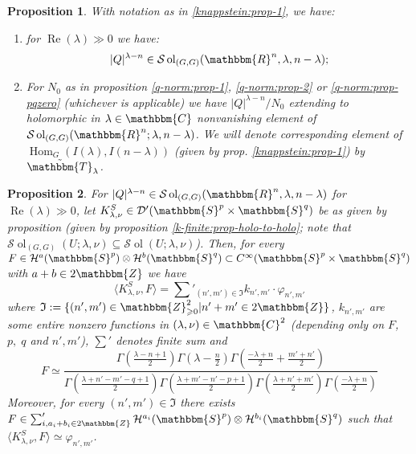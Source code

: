 \documentclass{article}
\newcommand{\assign}{:=}
\newcommand{\tmop}[1]{\ensuremath{\operatorname{#1}}}
\numberwithin{definition}{section}
\numberwithin{lemma}{section}
\newtheorem{proposition}{Proposition}
\numberwithin{proposition}{section}
{\theorembodyfont{\rmfamily}\newtheorem{remark}{Remark}
\numberwithin{remark}{section}
}
\begin{document}
\begin{proposition}
  \label{knappstein:prop-holo}With notation as in \ref{knappstein:prop-1}, we
  have:
  \begin{enumerate}
    \item for $\tmop{Re} ( \lambda) \gg 0$ we have:
    \[ | Q |^{\lambda - n} \in \mathcal{S} \tmop{ol}_{( G, G)} (
       \mathbbm{R}^n, \lambda, n - \lambda) ; \]
    \item For $N_0$ as in proposition \ref{q-norm:prop-1}, \ref{q-norm:prop-2}
    or \ref{q-norm:prop-pqzero} (whichever is applicable) we have $| Q
    |^{\lambda - n} / N_0$ extending to holomorphic in $\lambda \in
    \mathbbm{C}$ nonvanishing element of $\mathcal{S} \tmop{ol}_{( G, G)} (
    \mathbbm{R}^n ; \lambda, n - \lambda)$. We will denote corresponding
    element of $\tmop{Hom}_G ( I ( \lambda), I ( n - \lambda))$ (given by
    prop. \ref{knappstein:prop-1}) by $\tilde{\mathbbm{T}}_{\lambda}$.
  \end{enumerate}
\end{proposition}

\begin{proposition}
  \label{knappstein:prop-kfinite}For $| Q |^{\lambda - n} \in \mathcal{S}
  \tmop{ol}_{( G, G)} ( \mathbbm{R}^n, \lambda, n - \lambda)$ for $\tmop{Re} (
  \lambda) \gg 0$, let $K_{\lambda, \nu}^S \in \mathcal{D}' ( \mathbbm{S}^p
  \times \mathbbm{S}^q)$ be as given by proposition (given by proposition
  \ref{k-finite:prop-holo-to-holo}; note that $\mathcal{S} \tmop{ol}_{( G, G)}
  ( U ; \lambda, \nu) \subseteq \mathcal{S} \tmop{ol} ( U ; \lambda, \nu)$).
  Then, for every $F \in \mathcal{H}^a ( \mathbbm{S}^p) \otimes \mathcal{H}^b
  ( \mathbbm{S}^q) \subset C^{\infty} ( \mathbbm{S}^p \times \mathbbm{S}^q)$
  with $a + b \in 2\mathbbm{Z}$ we have
  \begin{equation}
    \langle K^S_{\lambda, \nu}, F \rangle = \sum'_{( n', m') \in \mathfrak{I}}
    k_{n', m'} \cdot \varphi_{n', m'}
  \end{equation}
  where $\mathfrak{I} \assign \{ ( n', m') \in \mathbbm{Z}_{\geqslant 0}^2 |
  n' + m' \in 2\mathbbm{Z} \}$, $k_{n', m'}$ are some entire nonzero functions
  in $( \lambda, \nu) \in \mathbbm{C}^2$ (depending only on $F$, $p, \; q$ and
  $n', m'$), $\sum'$ denotes finite sum and
  \[ F \simeq \frac{\Gamma \left( \frac{\lambda - n + 1}{2} \right) \Gamma
     \left( \lambda - \frac{n}{2} \right) \Gamma \left( \frac{- \lambda +
     n}{2} + \frac{m' + n'}{2} \right)}{\Gamma \left( \frac{\lambda + n' - m'
     - q + 1}{2} \right) \Gamma \left( \frac{\lambda + m' - n' - p + 1}{2}
     \right) \Gamma \left( \frac{\lambda + n' + m'}{2} \right) \Gamma \left(
     \frac{- \lambda + n}{2} \right)} \]
  Moreover, for every $( n', m') \in \mathfrak{I}$ there exists $F \in
  \sum_{i, a_i + b_i \in 2\mathbbm{Z}}' \mathcal{H}^{a_i} ( \mathbbm{S}^p)
  \otimes \mathcal{H}^{b_i} ( \mathbbm{S}^q)$ such that $\langle K_{\lambda,
  \nu}^S, F \rangle \simeq \varphi_{n', m'}$.
\end{proposition}
\end{document}
